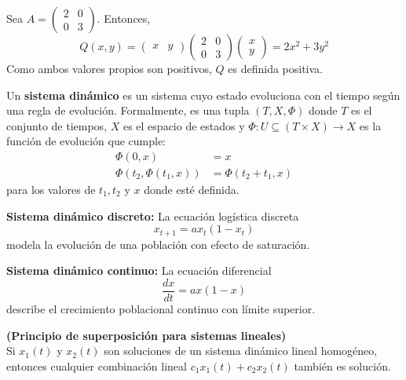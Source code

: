 \begin{example}
Sea $A = \begin{pmatrix} 2 & 0 \\ 0 & 3 \end{pmatrix}$. Entonces,
\[
Q(x, y) = \begin{pmatrix} x & y \end{pmatrix}
\begin{pmatrix} 2 & 0 \\ 0 & 3 \end{pmatrix}
\begin{pmatrix} x \\ y \end{pmatrix}
= 2x^2 + 3y^2
\]
Como ambos valores propios son positivos, $Q$ es definida positiva.
\end{example}

\begin{definition}
Un \textbf{sistema dinámico} es un sistema cuyo estado evoluciona con el tiempo según una regla de evolución. Formalmente, es una tupla $(T, X, \Phi)$ donde $T$ es el conjunto de tiempos, $X$ es el espacio de estados y $\Phi: U \subseteq (T \times X) \to X$ es la función de evolución que cumple:
\begin{align*}
\Phi(0, x) &= x \\
\Phi(t_2, \Phi(t_1, x)) &= \Phi(t_2 + t_1, x)
\end{align*}
para los valores de $t_1, t_2$ y $x$ donde esté definida.
\end{definition}

\begin{example}
\textbf{Sistema dinámico discreto:} La ecuación logística discreta
\[
x_{t+1} = a x_t (1 - x_t)
\]
modela la evolución de una población con efecto de saturación.
\end{example}

\begin{example}
\textbf{Sistema dinámico continuo:} La ecuación diferencial
\[
\frac{dx}{dt} = a x (1 - x)
\]
describe el crecimiento poblacional continuo con límite superior.
\end{example}

\begin{theorem}
\textbf{(Principio de superposición para sistemas lineales)}\\
Si $x_1(t)$ y $x_2(t)$ son soluciones de un sistema dinámico lineal homogéneo, entonces cualquier combinación lineal $c_1 x_1(t) + c_2 x_2(t)$ también es solución.
\end{theorem}
